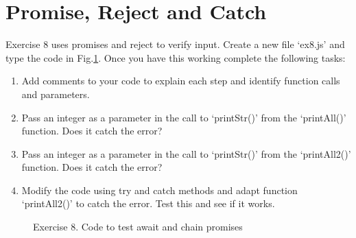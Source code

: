 \section{Promise, Reject and Catch}			
Exercise 8 uses promises and reject to verify input. %
Create a new file `ex8.js' and type the code in Fig.\ref{fi:ex58}. Once you have this working complete the following tasks:
\begin{enumerate}
	\item Add comments to your code to explain each step and identify function calls and parameters.
	\item Pass an integer as a parameter in the call to `printStr()' from the `printAll()' function. Does it catch the error?
	\item Pass an integer as a parameter in the call to `printStr()' from the `printAll2()' function. Does it catch the error?
	\item Modify the code using try and catch methods and adapt function `printAll2()' to catch the error. Test this and see if it works. 
\end{enumerate}
\begin{figure}[t!]
	\centering
	
	\caption{Exercise 8. Code to test await and chain promises}
	\label{fi:ex58}
\end{figure}
	

